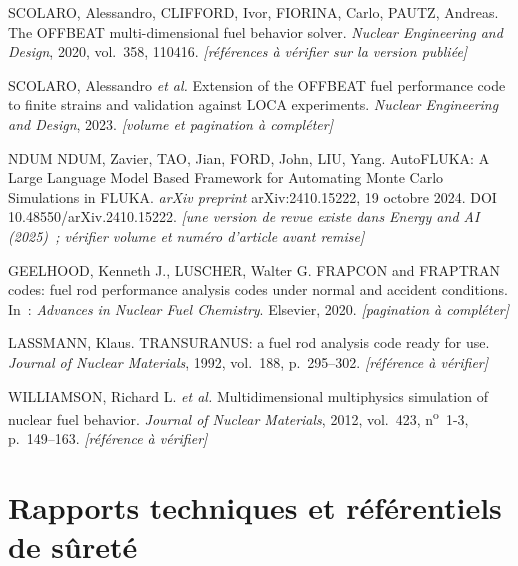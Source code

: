 \documentclass[12pt,a4paper,french]{report}
\begin{document}
\begin{list}{}{\setlength{\leftmargin}{1cm}\setlength{\itemindent}{-1cm}}

\item[{[1]}]
SCOLARO, Alessandro, CLIFFORD, Ivor, FIORINA, Carlo, PAUTZ, Andreas.
The OFFBEAT multi-dimensional fuel behavior solver.
\textit{Nuclear Engineering and Design}, 2020, vol.~358, 110416.
\textit{\color{red}[références à vérifier sur la version publiée]}

\item[{[2]}]
SCOLARO, Alessandro \textit{et al.}
Extension of the OFFBEAT fuel performance code to finite strains and
validation against LOCA experiments.
\textit{Nuclear Engineering and Design}, 2023.
\textit{\color{red}[volume et pagination à compléter]}

\item[{[3]}]
NDUM NDUM, Zavier, TAO, Jian, FORD, John, LIU, Yang.
AutoFLUKA: A Large Language Model Based Framework for Automating Monte Carlo
Simulations in FLUKA. \textit{arXiv preprint} arXiv:2410.15222, 19 octobre 2024.
DOI 10.48550/arXiv.2410.15222.
\textit{\color{red}[une version de revue existe dans Energy and AI (2025)~;
vérifier volume et numéro d'article avant remise]}

\item[{[4]}]
GEELHOOD, Kenneth J., LUSCHER, Walter G.
FRAPCON and FRAPTRAN codes: fuel rod performance analysis codes under normal
and accident conditions. In~: \textit{Advances in Nuclear Fuel Chemistry}.
Elsevier, 2020.
\textit{\color{red}[pagination à compléter]}

\item[{[5]}]
LASSMANN, Klaus.
TRANSURANUS: a fuel rod analysis code ready for use.
\textit{Journal of Nuclear Materials}, 1992, vol.~188, p.~295--302.
\textit{\color{red}[référence à vérifier]}

\item[{[6]}]
WILLIAMSON, Richard L. \textit{et al.}
Multidimensional multiphysics simulation of nuclear fuel behavior.
\textit{Journal of Nuclear Materials}, 2012, vol.~423, n\textsuperscript{o}~1-3,
p.~149--163.
\textit{\color{red}[référence à vérifier]}

\end{list}

\section*{Rapports techniques et référentiels de sûreté}
\end{document}
